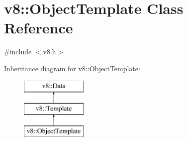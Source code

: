 \hypertarget{classv8_1_1_object_template}{}\section{v8\+:\+:Object\+Template Class Reference}
\label{classv8_1_1_object_template}


{\ttfamily \#include $<$v8.\+h$>$}

Inheritance diagram for v8\+:\+:Object\+Template\+:\begin{figure}[H]
\begin{center}
\leavevmode
\includegraphics[height=3.000000cm]{classv8_1_1_object_template}
\end{center}
\end{figure}
